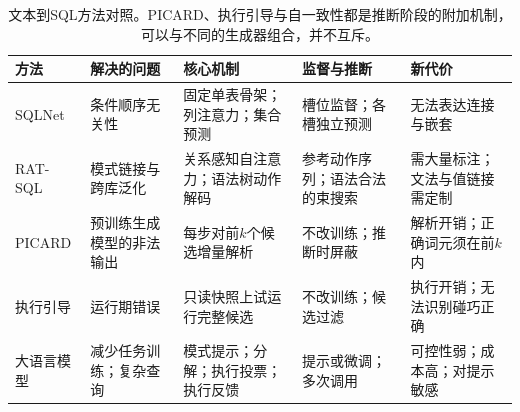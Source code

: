 \begin{table}[htbp]
  \centering
  \begin{tabularx}{\linewidth}{@{}l XXXX@{}}
    \toprule
    方法&解决的问题&核心机制&监督与推断&新代价\\
    \midrule
    SQLNet&条件顺序无关性&固定单表骨架；列注意力；集合预测&槽位监督；各槽独立预测&无法表达连接与嵌套\\
    RAT-SQL&模式链接与跨库泛化&关系感知自注意力；语法树动作解码&参考动作序列；语法合法的束搜索&需大量标注；文法与值链接需定制\\
    PICARD&预训练生成模型的非法输出&每步对前$k$个候选增量解析&不改训练；推断时屏蔽&解析开销；正确词元须在前$k$内\\
    执行引导&运行期错误&只读快照上试运行完整候选&不改训练；候选过滤&执行开销；无法识别碰巧正确\\
    大语言模型&减少任务训练；复杂查询&模式提示；分解；执行投票；执行反馈&提示或微调；多次调用&可控性弱；成本高；对提示敏感\\
    \bottomrule
  \end{tabularx}
  \caption{文本到SQL方法对照。PICARD、执行引导与自一致性都是推断阶段的附加机制，可以与不同的生成器组合，并不互斥。}
  \label{tab:nlp-analysis-text-to-sql-methods}
\end{table}
